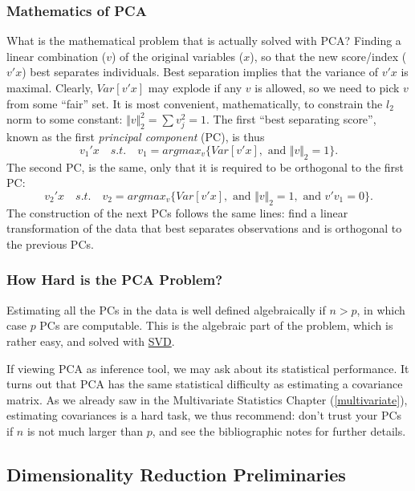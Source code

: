\documentclass[]{book}
\theoremstyle{definition}
\theoremstyle{definition}
\theoremstyle{definition}
\theoremstyle{remark}
\begin{document}
\subsubsection{Mathematics of PCA}\label{mathematics-of-pca}

What is the mathematical problem that is actually solved with PCA?
Finding a linear combination (\(v\)) of the original variables (\(x\)),
so that the new score/index (\(v'x\)) best separates individuals. Best
separation implies that the variance of \(v'x\) is maximal. Clearly,
\(Var[v'x]\) may explode if any \(v\) is allowed, so we need to pick
\(v\) from some ``fair'' set. It is most convenient, mathematically, to
constrain the \(l_2\) norm to some constant:
\(\Vert v \Vert^2_2=\sum v_j^2=1\). The first ``best separating score'',
known as the first \emph{principal component} (PC), is thus
\[v_1'x \quad s.t. \quad v_1=argmax_{v}\{Var[v'x], \text{ and } \Vert v \Vert_2=1  \} .\]
The second PC, is the same, only that it is required to be orthogonal to
the first PC:
\[v_2'x \quad s.t. \quad v_2=argmax_{v}\{Var[v'x], \text{ and } \Vert v \Vert_2=1, \text{ and } v'v_1=0 \} .\]
The construction of the next PCs follows the same lines: find a linear
transformation of the data that best separates observations and is
orthogonal to the previous PCs.

\subsubsection{How Hard is the PCA
Problem?}\label{how-hard-is-the-pca-problem}

Estimating all the PCs in the data is well defined algebraically if
\(n>p\), in which case \(p\) PCs are computable. This is the algebraic
part of the problem, which is rather easy, and solved with
\href{https://en.wikipedia.org/wiki/Singular-value_decomposition}{SVD}.

If viewing PCA as inference tool, we may ask about its statistical
performance. It turns out that PCA has the same statistical difficulty
as estimating a covariance matrix. As we already saw in the Multivariate
Statistics Chapter (\ref{multivariate}), estimating covariances is a
hard task, we thus recommend: don't trust your PCs if \(n\) is not much
larger than \(p\), and see the bibliographic notes for further details.

\subsection{Dimensionality Reduction
Preliminaries}\label{dimensionality-reduction-preliminaries}
\end{document}
